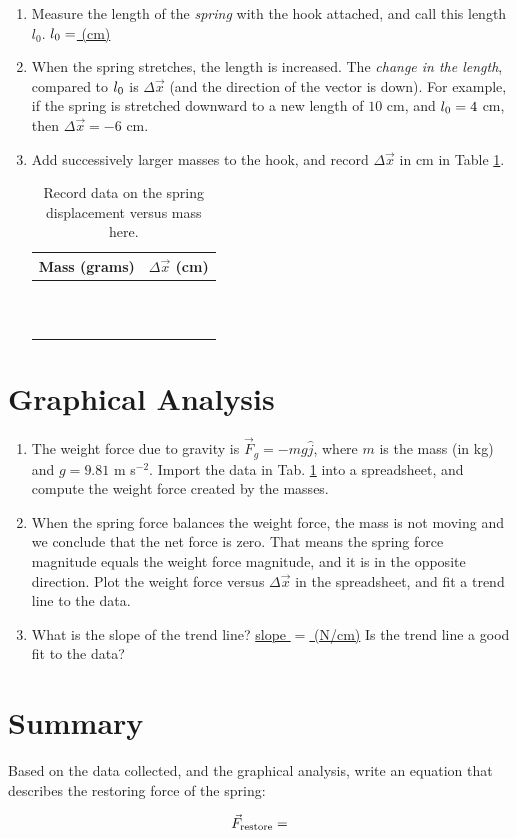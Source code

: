 \documentclass{article}
\begin{document}
\begin{enumerate}
\item Measure the length of the \textit{spring} with the hook attached, and call this length $l_{0}$.  \uline{$l_{\rm 0}=$ \hspace{1cm} (cm)}
\item When the spring stretches, the length is increased.  The \textit{change in the length}, compared to $l_{\rm 0}$ is $\Delta \vec{x}$ (and the direction of the vector is down).  For example, if the spring is stretched downward to a new length of $10$ cm, and $l_{\rm 0} = 4$ cm, then $\Delta \vec{x} = -6$ cm.
\item Add successively larger masses to the hook, and record $\Delta \vec{x}$ in cm in Table \ref{tab:data}.
\begin{table}[hb]
\centering
\begin{tabular}{| c | c |}
\hline
Mass (grams) & $\Delta \vec{x}$ (cm) \\ \hline
 &  \\ \hline
 &  \\ \hline
 &  \\ \hline
 &  \\ \hline
 &  \\ \hline
 &  \\ \hline
 &  \\ \hline
 &  \\ \hline
 &  \\ \hline
 &  \\ \hline
 &  \\ \hline
\end{tabular}
\caption{\label{tab:data} Record data on the spring displacement versus mass here.}
\end{table}
\end{enumerate}

\section{Graphical Analysis}

\begin{enumerate}
\item The weight force due to gravity is $\vec{F}_g = -mg \hat{j}$, where $m$ is the mass (in kg) and $g = 9.81$ m s$^{-2}$.  Import the data in Tab. \ref{tab:data} into a spreadsheet, and compute the weight force created by the masses.
\item When the spring force balances the weight force, the mass is not moving and we conclude that the net force is zero.  That means the spring force magnitude equals the weight force magnitude, and it is in the opposite direction.  Plot the weight force versus $\Delta \vec{x}$ in the spreadsheet, and fit a trend line to the data.
\item What is the slope of the trend line? \uline{slope $=$ \hspace{1cm} (N/cm)} Is the trend line a good fit to the data?
\end{enumerate}

\section{Summary}

Based on the data collected, and the graphical analysis, write an equation that describes the restoring force of the spring:

\begin{equation}
\vec{F}_{\rm restore} = 
\end{equation}
\end{document}
